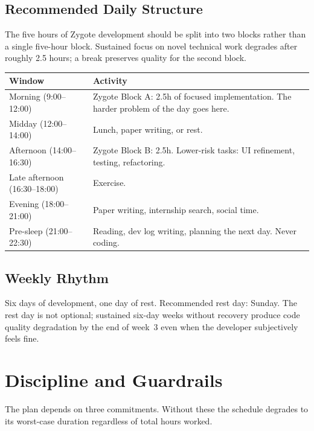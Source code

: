 \documentclass[11pt,letterpaper]{article}
\begin{document}
\subsection*{Recommended Daily Structure}

The five hours of Zygote development should be split into two blocks rather than a single five-hour block. Sustained focus on novel technical work degrades after roughly 2.5 hours; a break preserves quality for the second block.

\begin{tabularx}{\textwidth}{@{}lX@{}}
\toprule
\textbf{Window} & \textbf{Activity} \\
\midrule
Morning (9:00--12:00) & Zygote Block A: 2.5h of focused implementation. The harder problem of the day goes here. \\
\addlinespace
Midday (12:00--14:00) & Lunch, paper writing, or rest. \\
\addlinespace
Afternoon (14:00--16:30) & Zygote Block B: 2.5h. Lower-risk tasks: UI refinement, testing, refactoring. \\
\addlinespace
Late afternoon (16:30--18:00) & Exercise. \\
\addlinespace
Evening (18:00--21:00) & Paper writing, internship search, social time. \\
\addlinespace
Pre-sleep (21:00--22:30) & Reading, dev log writing, planning the next day. Never coding. \\
\bottomrule
\end{tabularx}

\subsection*{Weekly Rhythm}

Six days of development, one day of rest. Recommended rest day: Sunday. The rest day is not optional; sustained six-day weeks without recovery produce code quality degradation by the end of week~3 even when the developer subjectively feels fine.

\section{Discipline and Guardrails}
\label{sec:discipline}

The plan depends on three commitments. Without these the schedule degrades to its worst-case duration regardless of total hours worked.
\end{document}
